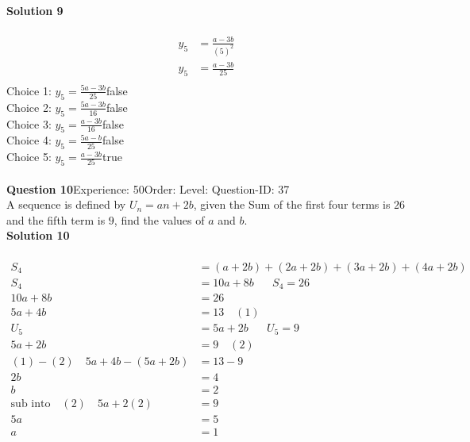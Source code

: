 \documentclass{article}
\begin{document}
\noindent\textbf{Solution 9}\\[2pt]
\\[-35pt]\begin{align*}
y_5&=\displaystyle\frac{a-3b}{(5)^2}\\[2pt]
y_5&=\displaystyle\frac{a-3b}{25}\\[2pt]
\end{align*}
Choice 1: \hspace{20pt}$y_5=\displaystyle\frac{5a-3b}{25}$\hspace{20pt}false\\
Choice 2: \hspace{20pt}$y_5=\displaystyle\frac{5a-3b}{16}$\hspace{20pt}false\\
Choice 3: \hspace{20pt}$y_5=\displaystyle\frac{a-3b}{16}$\hspace{20pt}false\\
Choice 4: \hspace{20pt}$y_5=\displaystyle\frac{5a-b}{25}$\hspace{20pt}false\\
Choice 5: \hspace{20pt}$y_5=\displaystyle\frac{a-3b}{25}$\hspace{20pt}true\\
\\[4pt]
\noindent\textbf{Question 10}\hspace{20pt}Experience: 50\hspace{20pt}Order: \hspace{20pt}Level: \hspace{20pt}Question-ID: 37\\[2pt]
A sequence is defined by $U_n=an+2b$, given the Sum of the first four terms is $26$ and the fifth term is $9$, find the values of $a$ and $b$.\\[4pt]
\noindent\textbf{Solution 10}\\[2pt]
\\[-35pt]\begin{align*}
S_4&=(a+2b)+(2a+2b)+(3a+2b)+(4a+2b)\\[2pt]
S_4&=10a+8b\hspace{20pt} S_4=26\\[2pt]
10a+8b&=26\\[2pt]
5a+4b&=13\quad (1)\\[12pt]
U_5&=5a+2b\hspace{20pt}U_5=9\\[2pt]
5a+2b&=9\quad (2)\\[12pt]
(1)-(2)\quad 5a+4b-(5a+2b)&=13-9\\[2pt]
2b&=4\\[2pt]
b&=2\\[12pt]
\text{sub into}\quad (2) \quad 5a+2(2)&=9\\[2pt]
5a&=5\\[2pt]
a&=1
\end{align*}
\end{document}

